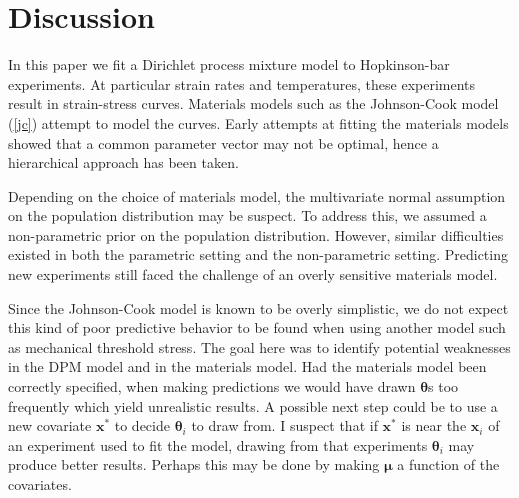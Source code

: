 \documentclass[12pt]{article}
\newcommand{\m}[1]{\mathbf{\bm{#1}}}
\begin{document}
\section{Discussion}

In this paper we fit a Dirichlet process mixture model to Hopkinson-bar experiments. At particular strain rates and temperatures, these experiments result in strain-stress curves. Materials models such as the Johnson-Cook model (\ref{jc}) attempt to model the curves. Early attempts at fitting the materials models showed that a common parameter vector may not be optimal, hence a hierarchical approach has been taken.

Depending on the choice of materials model, the multivariate normal assumption on the population distribution may be suspect. To address this, we assumed a non-parametric prior on the population distribution. However, similar difficulties existed in both the parametric setting and the non-parametric setting. Predicting new experiments still faced the challenge of an overly sensitive materials model.

Since the Johnson-Cook model is known to be overly simplistic, we do not expect this kind of poor predictive behavior to be found when using another model such as mechanical threshold stress. The goal here was to identify potential weaknesses in the DPM model and in the materials model. Had the materials model been correctly specified, when making predictions we would have drawn $\m{\theta}$s too frequently which yield unrealistic results. A possible next step could be to use a new covariate $\m{x}^*$ to decide $\m{\theta}_i$ to draw from. I suspect that if $\m{x}^*$ is near the $\m{x}_i$ of an experiment used to fit the model, drawing from that experiments $\m{\theta}_i$ may produce better results. Perhaps this may be done by making $\m{\mu}$ a function of the covariates.



\end{document}
